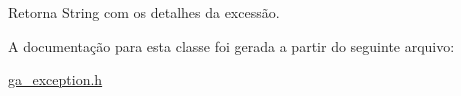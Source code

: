 \begin{DoxyReturn}{Retorna}
String com os detalhes da excessão. 
\end{DoxyReturn}


A documentação para esta classe foi gerada a partir do seguinte arquivo:\begin{DoxyCompactItemize}
\item 
\hyperlink{ga__exception_8h}{ga\_\-exception.h}\end{DoxyCompactItemize}
